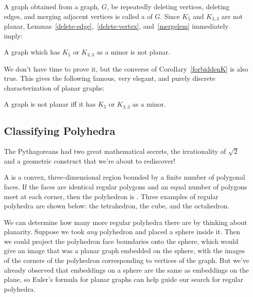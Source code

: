 A graph obtained from a graph, $G$, be repeatedly deleting vertices,
deleting edges, and merging adjacent vertices is called a  of
$G$.  Since $K_5$ and $K_{3,3}$ are not planar,
Lemmas~\ref{delete-edge},~\ref{delete-vertex}, and~\ref{mergelem}
immediately imply:

\begin{corollary}\label{forbiddenK}
  A graph which has $K_5$ or $K_{3,3}$ as a minor is not planar.
\end{corollary}

We don't have time to prove it, but the converse of
Corollary~\ref{forbiddenK} is also true.  This gives the following famous,
very elegant, and purely discrete characterization of planar graphs:

\begin{theorem}[Kuratowksi]
  A graph is not planar iff it has $K_5$ or $K_{3,3}$ as a minor.
\end{theorem}

\subsection{Classifying Polyhedra}

The Pythagoreans had two great mathematical secrets, the irrationality of
$\sqrt{2}$ and a geometric construct that we're about to rediscover!

A  is a convex, three-dimensional region bounded by a
finite number of polygonal faces.  If the faces are identical regular
polygons and an equal number of polygons meet at each corner, then the
polyhedron is .  Three examples of regular polyhedra are
shown below: the tetrahedron, the cube, and the octahedron.

\begin{center}

\end{center}


We can determine how many more regular polyhedra there are by thinking
about planarity.  Suppose we took \emph{any} polyhedron and placed a
sphere inside it.  Then we could project the polyhedron face boundaries
onto the sphere, which would give an image that was a planar graph
embedded on the sphere, with the images of the corners of the polyhedron
corresponding to vertices of the graph.  But we've already observed that
embeddings on a sphere are the same as embeddings on the plane, so Euler's
formula for planar graphs can help guide our search for regular polyhedra.

